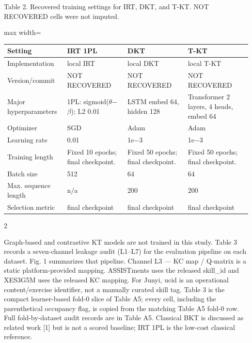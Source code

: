 \documentclass[10pt,a4paper]{article}
\begin{document}
\noindent\begin{minipage}{\textwidth}
\centering
{\fontsize{8}{9.5}\selectfont Table 2. Recovered training settings for IRT, DKT, and T-KT. NOT RECOVERED cells were not imputed.\par}
\vspace{0.35em}
\begin{adjustbox}{max width=\textwidth}
{\small
\begin{tabular}{@{}llll@{}}
\toprule
Setting & IRT 1PL & DKT & T-KT \\
\midrule
Implementation & local IRT & local DKT & local T-KT \\
Version/commit & NOT RECOVERED & NOT RECOVERED & NOT RECOVERED \\
Major hyperparameters & 1PL: sigmoid($\theta$$-$$\beta$); L2 0.01 & LSTM embed 64, hidden 128 & Transformer 2 layers, 4 heads, embed 64 \\
Optimizer & SGD & Adam & Adam \\
Learning rate & 0.01 & 1e$-$3 & 1e$-$3 \\
Training length & Fixed 10 epochs; final checkpoint. & Fixed 50 epochs; final checkpoint. & Fixed 50 epochs; final checkpoint. \\
Batch size & 512 & 64 & 64 \\
Max. sequence length & n/a & 200 & 200 \\
Selection metric & final checkpoint & final checkpoint & final checkpoint \\
\bottomrule
\end{tabular}}
\end{adjustbox}
\end{minipage}
\vspace{0.55em}
\begin{multicols}{2}


Graph-based and contrastive KT models are not trained in this study. Table 3 records a seven-channel leakage audit (L1--L7) for the evaluation pipeline on each dataset. Fig. 1 summarizes that pipeline. Channel L3 --- KC map / Q-matrix is a static platform-provided mapping. ASSISTments uses the released skill\_id and XES3G5M uses the released KC mapping. For Junyi, ucid is an operational content/exercise identifier, not a manually curated skill tag. Table 3 is the compact learner-based fold-0 slice of Table A5; every cell, including the parenthetical occupancy flag, is copied from the matching Table A5 fold-0 row. Full fold-by-dataset audit records are in Table A5. Classical BKT is discussed as related work [1] but is not a scored baseline; IRT 1PL is the low-cost classical reference.


\end{multicols}
\end{document}
